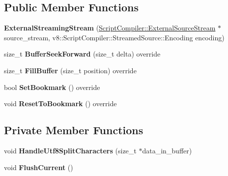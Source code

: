 \subsection*{Public Member Functions}
\begin{DoxyCompactItemize}
\item 
{\bfseries External\+Streaming\+Stream} (\hyperlink{classv8_1_1_script_compiler_1_1_external_source_stream}{Script\+Compiler\+::\+External\+Source\+Stream} $\ast$source\+\_\+stream, v8\+::\+Script\+Compiler\+::\+Streamed\+Source\+::\+Encoding encoding)\hypertarget{classv8_1_1internal_1_1_external_streaming_stream_ad2e7551b91a1ff90a62b7a0f0975f3d1}{}\label{classv8_1_1internal_1_1_external_streaming_stream_ad2e7551b91a1ff90a62b7a0f0975f3d1}

\item 
size\+\_\+t {\bfseries Buffer\+Seek\+Forward} (size\+\_\+t delta) override\hypertarget{classv8_1_1internal_1_1_external_streaming_stream_a2e365ef0a56638899312a329154ef135}{}\label{classv8_1_1internal_1_1_external_streaming_stream_a2e365ef0a56638899312a329154ef135}

\item 
size\+\_\+t {\bfseries Fill\+Buffer} (size\+\_\+t position) override\hypertarget{classv8_1_1internal_1_1_external_streaming_stream_a087f8260c28121a436e2f86c75908572}{}\label{classv8_1_1internal_1_1_external_streaming_stream_a087f8260c28121a436e2f86c75908572}

\item 
bool {\bfseries Set\+Bookmark} () override\hypertarget{classv8_1_1internal_1_1_external_streaming_stream_a490f67bc96a0ad88160b2d336fc89ecb}{}\label{classv8_1_1internal_1_1_external_streaming_stream_a490f67bc96a0ad88160b2d336fc89ecb}

\item 
void {\bfseries Reset\+To\+Bookmark} () override\hypertarget{classv8_1_1internal_1_1_external_streaming_stream_afdfe1bc92955de3f3458e66aa56e9799}{}\label{classv8_1_1internal_1_1_external_streaming_stream_afdfe1bc92955de3f3458e66aa56e9799}

\end{DoxyCompactItemize}
\subsection*{Private Member Functions}
\begin{DoxyCompactItemize}
\item 
void {\bfseries Handle\+Utf8\+Split\+Characters} (size\+\_\+t $\ast$data\+\_\+in\+\_\+buffer)\hypertarget{classv8_1_1internal_1_1_external_streaming_stream_ad71e8b92c7bf62b34e89283e706c05be}{}\label{classv8_1_1internal_1_1_external_streaming_stream_ad71e8b92c7bf62b34e89283e706c05be}

\item 
void {\bfseries Flush\+Current} ()\hypertarget{classv8_1_1internal_1_1_external_streaming_stream_a19751f2fce1c74dfe2af7eb5ea416138}{}\label{classv8_1_1internal_1_1_external_streaming_stream_a19751f2fce1c74dfe2af7eb5ea416138}

\end{DoxyCompactItemize}
